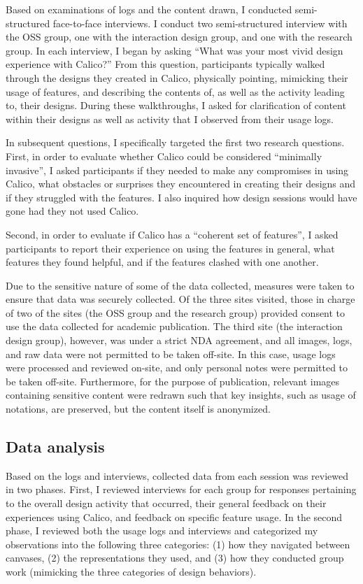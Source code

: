 Based on examinations of logs and the content drawn, I conducted semi-structured face-to-face interviews. I conduct two semi-structured interview with the OSS group, one with the interaction design group, and one with the research group. In each interview, I began by asking ``What was your most vivid design experience with Calico?'' From this question, participants typically walked through the designs they created in Calico, physically pointing, mimicking their usage of features, and describing the contents of, as well as the activity leading to, their designs. During these walkthroughs, I asked for clarification of content within their designs as well as activity that I observed from their usage logs.

In subsequent questions, I specifically targeted the first two research questions. First, in order to evaluate whether Calico could be considered ``minimally invasive'', I asked participants if they needed to make any compromises in using Calico, what obstacles or surprises they encountered in creating their designs and if they struggled with the features. I also inquired how design sessions would have gone had they not used Calico. 

Second, in order to evaluate if Calico has a ``coherent set of features'', I asked participants to report their experience on using the features in general, what features they found helpful, and if the features clashed with one another. 

Due to the sensitive nature of some of the data collected, measures were taken to ensure that data was securely collected. Of the three sites visited, those in charge of two of the sites (the OSS group and the research group) provided consent to use the data collected for academic publication. The third site (the interaction design group), however,  was under a strict NDA agreement, and all images, logs, and raw data were not permitted to be taken off-site. In this case, usage logs were processed and reviewed on-site, and only personal notes were permitted to be taken off-site. Furthermore, for the purpose of publication, relevant images containing sensitive content were redrawn such that key insights, such as usage of notations, are preserved, but the content itself is anonymized.

\subsection{Data analysis}

Based on the logs and interviews, collected data from each session was reviewed in two phases. First, I reviewed interviews for each group for responses pertaining to the overall design activity that occurred, their general feedback on their experiences using Calico, and feedback on specific feature usage. In the second phase, I reviewed both the usage logs and interviews and categorized my observations into the following three categories: (1) how they navigated between canvases, (2) the representations they used, and (3) how they conducted group work (mimicking the three categories of design behaviors). 

